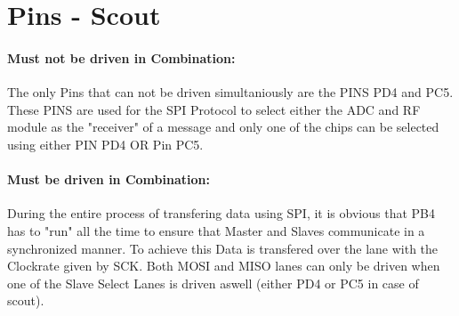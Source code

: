 \documentclass[12pt]{article}
\begin{document}
\lstset{language=C++}

\section*{Pins - Scout}

\paragraph{Must not be driven in Combination:}
The only Pins that can not be driven simultaniously are the PINS PD4 and PC5. These PINS are used for the SPI Protocol to select either the ADC and RF module as the "receiver" of a message and only one of the chips can be selected using either PIN PD4 OR Pin PC5.

\paragraph{Must be driven in Combination:}
During the entire process of transfering data using SPI, it is obvious that PB4 has to "run" all the time to ensure that Master and Slaves communicate in a  synchronized manner. To achieve this Data is transfered over the lane with the Clockrate given by SCK. Both MOSI and MISO lanes can only be driven when one of the Slave Select Lanes is driven aswell (either PD4 or PC5 in case of scout).
\end{document}
